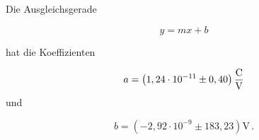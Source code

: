 Die Ausgleichsgerade 

\begin{equation*}
   y = m x + b
\end{equation*}

hat die Koeffizienten

\begin{equation*}
  a = \left( 1,24 \cdot 10^{-11} \pm 0,40 \right) \unit{\dfrac{\coulomb}{\volt}}
\end{equation*}
und

\begin{equation*}
  b = \left( -2,92 \cdot 10^{-9} \pm 183,23 \right) \unit{\volt \, .}
\end{equation*}
